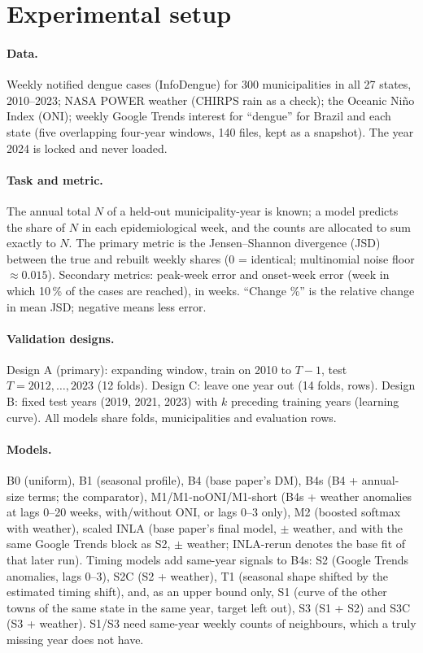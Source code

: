 \documentclass[11pt,a4paper]{article}
\begin{document}
\section{Experimental setup}
\paragraph{Data.} Weekly notified dengue cases (InfoDengue) for 300 municipalities in all 27 states, 2010--2023; NASA
POWER weather (CHIRPS rain as a check); the Oceanic Ni\~no Index (ONI); weekly Google Trends interest for ``dengue'' for
Brazil and each state (five overlapping four-year windows, 140 files, kept as a snapshot). The year 2024 is locked and
never loaded.
\paragraph{Task and metric.} The annual total $N$ of a held-out municipality-year is known; a model predicts the share of
$N$ in each epidemiological week, and the counts are allocated to sum exactly to $N$. The primary metric is the
Jensen--Shannon divergence (JSD) between the true and rebuilt weekly shares (0 = identical; multinomial noise floor
$\approx 0.015$). Secondary metrics: peak-week error and onset-week error (week in which 10\,\% of the cases are
reached), in weeks. ``Change \%'' is the relative change in mean JSD; negative means less error.
\paragraph{Validation designs.} Design A (primary): expanding window, train on 2010 to $T-1$, test $T=2012,\dots,2023$
(12 folds). Design C: leave one year out (14 folds, \nRowsC{} rows). Design B: fixed test years (2019, 2021, 2023) with
$k$ preceding training years (learning curve). All models share folds, municipalities and evaluation rows.
\paragraph{Models.} B0 (uniform), B1 (seasonal profile), B4 (base paper's DM), B4s (B4 + annual-size terms; the
comparator), M1/M1-noONI/M1-short (B4s + weather anomalies at lags 0--20 weeks, with/without ONI, or lags 0--3 only),
M2 (boosted softmax with weather), scaled INLA (base paper's final model, $\pm$ weather, and with the same Google
Trends block as S2, $\pm$ weather; INLA-rerun denotes the base fit of that later run). Timing models add same-year
signals to B4s: S2 (Google Trends anomalies, lags 0--3), S2C (S2 + weather), T1 (seasonal shape shifted by the
estimated timing shift), and, as an upper bound only, S1 (curve of the other towns of the same state in the same year,
target left out), S3 (S1 + S2) and S3C (S3 + weather). S1/S3 need same-year weekly counts of neighbours, which a truly
missing year does not have.
\end{document}
